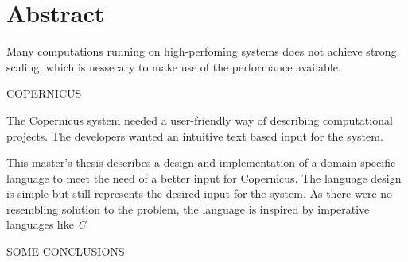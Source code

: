 \begingroup
\let\clearpage\relax
\let\cleardoublepage\relax
\let\cleardoublepage\relax

\chapter*{Abstract}

Many computations running on high-perfoming systems does not achieve
strong scaling, which is nessecary to make use of the performance
available.

COPERNICUS

The Copernicus system needed a user-friendly way of describing
computational projects. The developers wanted an intuitive text based
input for the system.

This master's thesis describes a design and implementation of a domain
specific language to meet the need of a better input for
Copernicus. The language design is simple but still represents the
desired input for the system. As there were no resembling solution to
the problem, the language is inspired by imperative languages
like \emph{C}.

SOME CONCLUSIONS

\endgroup			

\vfill
